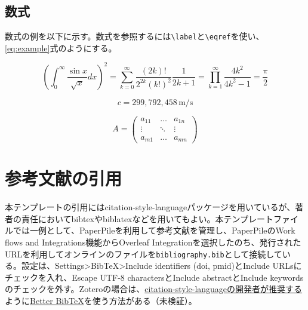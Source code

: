 \documentclass[fontsize=9pt, jafontscale=.95, twocolumn, a4paper]{jlreq}
\begin{document}
\subsection*{数式}

数式の例を以下に示す。数式を参照するには\verb|\label|と\verb|\eqref|を使い、\eqref{eq:example}式のようにする。

\begin{equation}
\left( \int_0^\infty \frac{\sin x}{\sqrt{x}} dx \right)^2=
\sum_{k=0}^\infty \frac{(2k)!}{2^{2k}(k!)^2} \frac{1}{2k+1}=
\prod_{k=1}^\infty \frac{4k^2}{4k^2 -1}= \frac{\pi}{2} \label{eq:example}
\end{equation}

\begin{equation}
  c = 299{,}792{,}458 \, \mathrm{m/s}
\end{equation}

\begin{equation}
  A = \begin{pmatrix}
        a_{11} & \ldots & a_{1n} \\
        \vdots & \ddots & \vdots \\
        a_{m1} & \ldots & a_{mn}
      \end{pmatrix}
\end{equation}

\section{参考文献の引用}

本テンプレートの引用にはcitation-style-languageパッケージを用いているが、著者の責任においてbibtexやbiblatexなどを用いてもよい。本テンプレートファイルでは一例として、PaperPileを利用して参考文献を管理し、PaperPileのWork  flows and Integrations機能からOverleaf Integrationを選択したのち、発行されたURLを利用してオンラインのファイルを\verb|bibliography.bib|として接続している。設定は、Settings\textgreater BibTeX\textgreater Include identifiers (doi, pmid)とInclude URLsにチェックを入れ、Escape UTF-8 charactersとInclude abstractとInclude keywordsのチェックを外す。Zoteroの場合は、\href{https://github.com/zepinglee/citeproc-lua/issues/24}{citation-style-languageの開発者が推奨する}ように\href{https://retorque.re/zotero-better-bibtex/}{Better BibTeX}を使う方法がある（未検証）。
\end{document}
